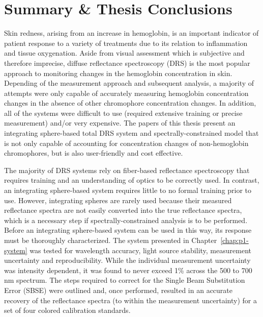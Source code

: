 \section{Summary \& Thesis Conclusions}
Skin redness, arising from an increase in hemoglobin, is an important indicator of patient response to a variety of treatments due to its relation to inflammation and tissue oxygenation. Aside from visual assessment which is subjective and therefore imprecise, diffuse reflectance spectroscopy (DRS) is the most popular approach to monitoring changes in the hemoglobin concentration in skin. Depending of the measurement approach and subsequent analysis, a majority of attempts were only capable of accurately measuring hemoglobin concentration changes in the absence of other chromophore concentration changes. In addition, all of the systems were difficult to use (required extensive training or precise measurement) and/or very expensive. The papers of this thesis present an integrating sphere-based total DRS system and spectrally-constrained model that is not only capable of accounting for concentration changes of non-hemoglobin chromophores, but is also user-friendly and cost effective.

The majority of DRS systems rely on fiber-based reflectance spectroscopy that requires training and an understanding of optics to be correctly used. In contrast, an integrating sphere-based system requires little to no formal training prior to use. However, integrating spheres are rarely used because their measured reflectance spectra are not easily converted into the true reflectance spectra, which is a necessary step if spectrally-constrained analysis is to be performed. Before an integrating sphere-based system can be used in this way, its response must be thoroughly characterized. The system presented in Chapter~\ref{chap:p1-system} was tested for wavelength accuracy, light source stability, measurement uncertainty and reproducibility. While the individual measurement uncertainty was intensity dependent, it was found to never exceed 1\% across the 500 to 700 nm spectrum. The steps required to correct for the Single Beam Substitution Error (SBSE) were outlined and, once performed, resulted in an accurate recovery of the reflectance spectra (to within the measurement uncertainty) for a set of four colored calibration standards.

